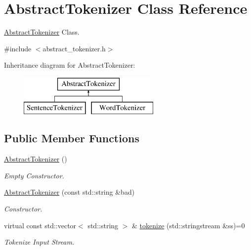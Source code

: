 \hypertarget{class_abstract_tokenizer}{}\section{Abstract\+Tokenizer Class Reference}
\label{class_abstract_tokenizer}


\hyperlink{class_abstract_tokenizer}{Abstract\+Tokenizer} Class.  




{\ttfamily \#include $<$abstract\+\_\+tokenizer.\+h$>$}

Inheritance diagram for Abstract\+Tokenizer\+:\begin{figure}[H]
\begin{center}
\leavevmode
\includegraphics[height=2.000000cm]{class_abstract_tokenizer}
\end{center}
\end{figure}
\subsection*{Public Member Functions}
\begin{DoxyCompactItemize}
\item 
\mbox{\label{class_abstract_tokenizer_ad5dd529f11552a1bb522f97077148270}} 
\hyperlink{class_abstract_tokenizer_ad5dd529f11552a1bb522f97077148270}{Abstract\+Tokenizer} ()
\begin{DoxyCompactList}\small\item\em Empty Constructor. \end{DoxyCompactList}\item 
\hyperlink{class_abstract_tokenizer_aef53a337d291e7ae1553511419d31190}{Abstract\+Tokenizer} (const std\+::string \&bad)
\begin{DoxyCompactList}\small\item\em Constructor. \end{DoxyCompactList}\item 
virtual const std\+::vector$<$ std\+::string $>$ \& \hyperlink{class_abstract_tokenizer_a566f425fc415ed1dfefc13706868a3ff}{tokenize} (std\+::stringstream \&ss)=0
\begin{DoxyCompactList}\small\item\em Tokenize Input Stream. \end{DoxyCompactList}\end{DoxyCompactItemize}
